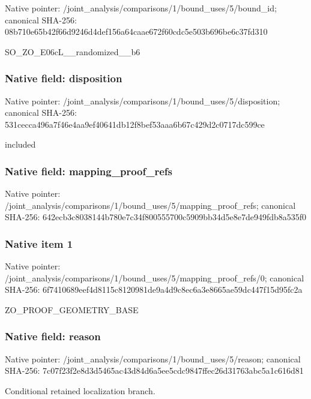 \documentclass[10pt,a4paper]{article}
\begin{document}
Native pointer: /joint\_analysis/comparis\allowbreak{}ons/1/bound\_uses/5/bound\allowbreak{}\_id; canonical SHA-256: 08b710e65b42f66d9246d4de\allowbreak{}f156a64caae672f60cdc5e50\allowbreak{}3b696be6c37fd310


SO\_ZO\_E06cL\_\_randomized\_\_b6


\subsubsection{Native field: disposition}


Native pointer: /joint\_analysis/comparis\allowbreak{}ons/1/bound\_uses/5/dispo\allowbreak{}sition; canonical SHA-256: 531cecca496a7f46e4aa9ef4\allowbreak{}0641db12f8bef53aaa6b67c4\allowbreak{}29d2c0717dc599ce


included


\subsubsection{Native field: mapping\_proof\_refs}


Native pointer: /joint\_analysis/comparis\allowbreak{}ons/1/bound\_uses/5/mappi\allowbreak{}ng\_proof\_refs; canonical SHA-256: 642ecb3c8038144b780e7c34\allowbreak{}f800555700c5909bb34d5e8e\allowbreak{}7de949fdb8a535f0



\subsubsection{Native item 1}


Native pointer: /joint\_analysis/comparis\allowbreak{}ons/1/bound\_uses/5/mappi\allowbreak{}ng\_proof\_refs/0; canonical SHA-256: 6f7410689eef4d8115c81209\allowbreak{}81de9a4d9c8ec6a3e8665ae5\allowbreak{}9dc447f15d95fc2a


ZO\_PROOF\_GEOMETRY\_BASE


\subsubsection{Native field: reason}


Native pointer: /joint\_analysis/comparis\allowbreak{}ons/1/bound\_uses/5/reaso\allowbreak{}n; canonical SHA-256: 7c07f23f2e8d3d5465ac43d8\allowbreak{}4d6a5ee5cdc9847ffec26d31\allowbreak{}763abc5a1c616d81


Conditional retained localization branch.
\end{document}
